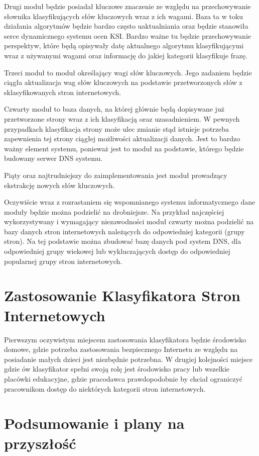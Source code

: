 \documentclass[10pt,twoside,a4paper]{article}
\begin{document}
Drugi moduł będzie posiadał kluczowe znaczenie ze względu na przechowywanie słownika klasyfikujących słów kluczowych wraz z ich wagami. Baza ta w toku działania algorytmów będzie bardzo często uaktualniania oraz będzie stanowiła serce dynamicznego systemu ocen KSI. Bardzo ważne tu będzie przechowywanie perspektyw, które będą opisywały datę aktualnego algorytmu klasyfikującymi wraz z używanymi wagami oraz informację do jakiej kategorii klasyfikuje frazę.

Trzeci moduł to moduł określający wagi słów kluczowych. Jego zadaniem będzie ciągła aktualizacja wag słów kluczowych na podstawie przetworzonych słów z sklasyfikowanych stron internetowych.

Czwarty moduł to baza danych, na której głównie będą dopisywane już przetworzone strony wraz z ich klasyfikacją oraz uzasadnieniem. W pewnych przypadkach klasyfikacja strony może ulec zmianie stąd istnieje potrzeba zapewnienia tej strony ciągłej możliwości aktualizacji danych. Jest to bardzo ważny element systemu, ponieważ jest to moduł na podstawie, którego będzie budowany serwer DNS systemu.

Piąty oraz najtrudniejszy do zaimplementowania jest moduł prowadzący ekstrakcję nowych słów kluczowych.

Oczywiście wraz z rozrastaniem się wspomnianego systemu informatycznego dane moduły będzie można podzielić na drobniejsze. Na przykład najczęściej wykorzystywany i wymagający niezawodności moduł czwarty można podzielić na bazy danych stron internetowych należących do odpowiedniej kategorii (grupy stron). Na tej podstawie można zbudować bazę danych pod system DNS, dla odpowiedniej grupy wiekowej lub wykluczających dostęp do odpowiedniej popularnej grupy stron internetowych.

\section{Zastosowanie Klasyfikatora Stron Internetowych}

Pierwszym oczywistym miejscem zastosowania klasyfikatora będzie środowisko domowe, gdzie potrzeba zastosowania bezpiecznego Internetu ze względu na posiadanie małych dzieci jest niezbędnie potrzebna. W drugiej kolejności miejsce gdzie ów klasyfikator spełni swoją rolę jest środowisko pracy lub wszelkie placówki edukacyjne, gdzie pracodawca prawdopodobnie by chciał ograniczyć pracownikom dostęp do niektórych kategorii stron internetowych.

\section{Podsumowanie i plany na przyszłość}
\end{document}
